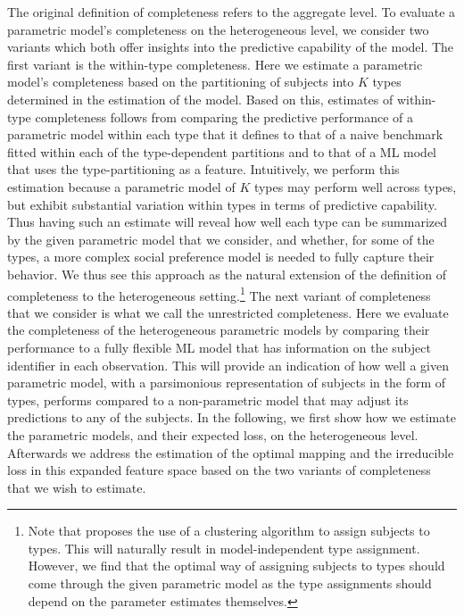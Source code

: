 \documentclass[11pt,a4paper]{article}
\theoremstyle{definition}
\begin{document}
The original definition of completeness refers to the aggregate level. To evaluate a parametric model's completeness on the heterogeneous level, we consider two variants which both offer insights into the predictive capability of the model. The first variant is the within-type completeness.  Here we estimate a parametric model's completeness based on the partitioning of subjects into $K$ types determined in the estimation of the model.  Based on this, estimates of within-type completeness follows from comparing the predictive performance of a parametric model within each type that it defines to that of a naive benchmark fitted within each of the type-dependent partitions and to that of a ML model that uses the type-partitioning as a feature.  Intuitively, we perform this estimation because a parametric model of $K$ types may perform well across types, but exhibit substantial variation within types in terms of predictive capability. Thus having such an estimate will reveal how well each type can be summarized by the given parametric model that we consider, and whether, for some of the types, a more complex social preference model is needed to fully capture their behavior. We thus see this approach as the natural extension of the definition of completeness to the heterogeneous setting.\footnote{Note that \cite{Fudenberg2021b} proposes the use of a clustering algorithm to assign subjects to types. This will naturally result in model-independent type assignment. However, we find that the optimal way of assigning subjects to types should come through the given parametric model as the type assignments should depend on the parameter estimates themselves.} The next variant of completeness that we consider is what we call the unrestricted completeness. Here we evaluate the completeness of the heterogeneous parametric models by comparing their performance to a fully flexible ML model that has information on the subject identifier in each observation. This will provide an indication of how well a given parametric model, with a parsimonious representation of subjects in the form of types, performs compared to a non-parametric model that may adjust its predictions to any of the subjects. In the following, we first show how we estimate the parametric models, and their expected loss, on the heterogeneous level. Afterwards we address the estimation of the optimal mapping and the irreducible loss in this expanded feature space based on the two variants of completeness that we wish to estimate.
\end{document}
